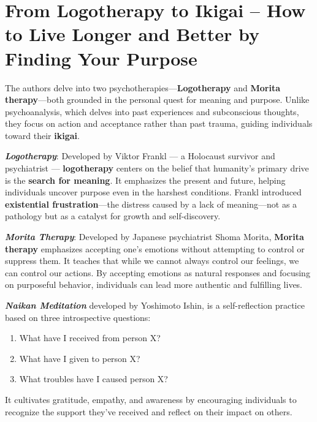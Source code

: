 \section*{From Logotherapy to Ikigai – How to Live Longer and Better by Finding Your Purpose}

The authors delve into two psychotherapies—\textbf{Logotherapy} and \textbf{Morita therapy}—both grounded in the personal quest for meaning and purpose. Unlike psychoanalysis, which delves into past experiences and subconscious thoughts, they focus on action and acceptance rather than past trauma, guiding individuals toward their \textbf{ikigai}.

\textit{\textbf{Logotherapy}}: Developed by Viktor Frankl — a Holocaust survivor and psychiatrist — \textbf{logotherapy} centers on the belief that humanity’s primary drive is the \textbf{search for meaning}. It emphasizes the present and future, helping individuals uncover purpose even in the harshest conditions. Frankl introduced \textbf{existential frustration}—the distress caused by a lack of meaning—not as a pathology but as a catalyst for growth and self-discovery.

\textit{\textbf{Morita Therapy}}: Developed by Japanese psychiatrist Shoma Morita, \textbf{Morita therapy} emphasizes accepting one's emotions without attempting to control or suppress them. It teaches that while we cannot always control our feelings, we can control our actions. By accepting emotions as natural responses and focusing on purposeful behavior, individuals can lead more authentic and fulfilling lives.

\textit{\textbf{Naikan Meditation}} developed by Yoshimoto Ishin, is a self-reflection practice based on three introspective questions:
\begin{enumerate}
    \item What have I received from person X?
    \item What have I given to person X?
    \item What troubles have I caused person X?
\end{enumerate}
It cultivates gratitude, empathy, and awareness by encouraging individuals to recognize the support they've received and reflect on their impact on others.